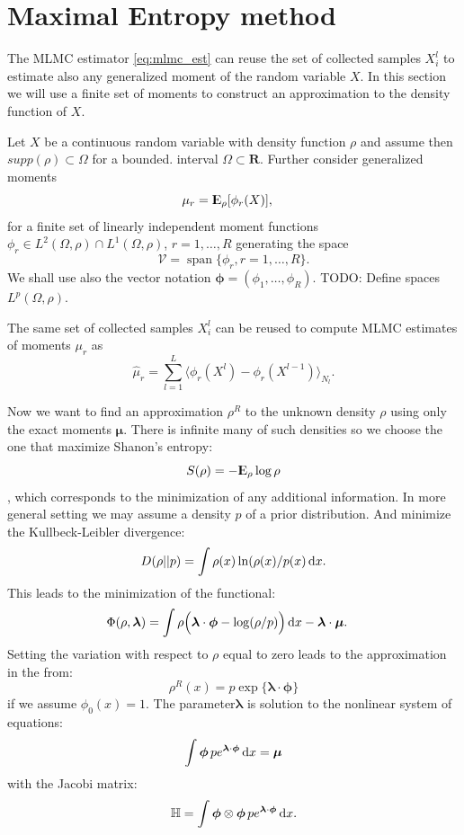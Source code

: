 \documentclass{article}
\def\d{\,{\rm d}}               %
\def\vc#1{\mathbf{\boldsymbol{#1}}}     %
\def\tn#1{\mathbb{#1}}
\def \E{{{\rm I\kern-.3em E}}}
\def\todo#1{{\color{red}TODO: #1}}
\def\R{\mathbf{R}}
\def\avg#1{\langle#1\rangle}
\DeclareMathOperator{\Span}{span}
\begin{document}
\section{Maximal Entropy method}
The MLMC  estimator \eqref{eq:mlmc_est} can reuse the set of collected samples $X^l_i$ to estimate also any generalized moment of the random variable $X$. In this section we will use a finite set of moments to construct an approximation to the density function of $X$.

Let $X$ be a continuous random variable with density function $\rho$
and assume then $supp(\rho) \subset \Omega$ for a bounded.
interval $\Omega \subset \R$. Further consider generalized moments
\begin{equation}
    \label{eq:gen_moments}
    \mu_r = \E_{\rho}[\phi_r(X)], \quad 
\end{equation}
for a finite set of linearly independent moment functions $\phi_r\in L^2(\Omega, \rho)\cap L^1(\Omega, \rho)$, $r=1,\dots, R$ generating the space
\[
    \mathcal V = \Span\{\phi_r, r=1,\dots, R\}.
\] We shall use also the vector notation $\vc \phi = (\phi_1, \dots,\phi_R)$. \todo{Define spaces $L^p(\Omega, \rho)$.}

The same set of collected samples $X^l_i$ can be reused to compute MLMC estimates of  moments $\mu_r$ as
\[
	\hat\mu_r = \sum_{l=1}^L \avg{\phi_r(X^l) - \phi_r(X^{l-1})}_{N_l}.
\]

Now we want to find an approximation $\rho^R$ to the unknown density $\rho$ using only the exact moments $\vc \mu$. There is infinite many of such densities so we choose the one that maximize Shanon's entropy:
\[
    S(\rho) = - \E_\rho \log \rho
\], which corresponds to the minimization of any additional information. 
In more general setting we may assume a density $p$ of a prior distribution. And minimize the Kullbeck-Leibler divergence:
\[
    D(\rho||p) = \int \rho(x) \ln(\rho(x)/ p(x) \d x.
\]
This leads to the minimization of the functional:
\begin{align}
    \Phi(\rho, \vc\lambda) 
    &= 
    \int \rho \Big( \vc\lambda \cdot \vc \phi - \log(\rho/p) \Big) \d x - \vc\lambda \cdot \vc\mu.
\end{align}
Setting the variation with respect to $\rho$ equal to zero leads to
the approximation in the from:
\[
    \rho^R(x) = p \exp\Big\{\vc \lambda \cdot \vc \phi \Big\}
\]
if we assume $\phi_0(x) = 1$. The parameter$\vc\lambda$ is solution
to the nonlinear system of equations:
\begin{equation}
    \label{eq:moment_system}
    \int \vc\phi\, p e^{\vc\lambda\cdot \vc\phi}\d x = \vc \mu
\end{equation}
with the Jacobi matrix:
\[
    \tn H = \int \vc\phi \otimes \vc \phi\, 
    p e^{\vc\lambda\cdot\vc\phi} \d x.
\]
\end{document}
